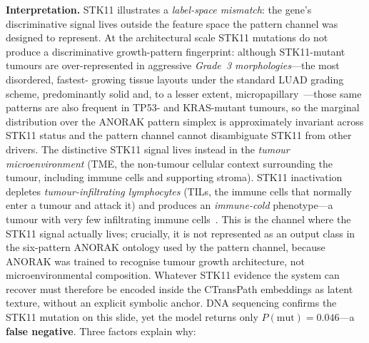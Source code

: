 \textbf{Interpretation.}
STK11 illustrates a \emph{label-space mismatch}: the gene's
discriminative signal lives outside the feature space the
pattern channel was designed to represent.
At the architectural scale STK11 mutations do not produce a
discriminative growth-pattern fingerprint: although
STK11-mutant tumours are over-represented in aggressive
\emph{Grade~3 morphologies}---the most disordered, fastest-%
growing tissue layouts under the standard LUAD grading scheme,
predominantly solid and, to a lesser extent,
micropapillary~\cite{pineda2025stk11morphology}---those same
patterns are also frequent in TP53- and KRAS-mutant tumours,
so the marginal distribution over the ANORAK pattern simplex
is approximately invariant across STK11 status and the
pattern channel cannot disambiguate STK11 from other drivers.
The distinctive STK11 signal lives instead in the
\emph{tumour microenvironment} (TME, the non-tumour cellular
context surrounding the tumour, including immune cells and
supporting stroma).
STK11 inactivation depletes
\emph{tumour-infiltrating lymphocytes} (TILs, the immune cells
that normally enter a tumour and attack
it) and produces an \emph{immune-cold} phenotype---a tumour
with very few infiltrating immune
cells~\cite{skoulidis2015krassubsets,skoulidis2018stk11pd1}.
This is the channel where the STK11 signal actually lives;
crucially, it is not represented as an output class in the
six-pattern ANORAK ontology used by the pattern channel,
because ANORAK was trained to recognise tumour growth
architecture, not microenvironmental composition.
Whatever STK11 evidence the system can recover must therefore
be encoded inside the CTransPath embeddings as latent texture,
without an explicit symbolic anchor.
DNA sequencing confirms the STK11 mutation on this slide, yet
the model returns only $P(\text{mut}) = 0.046$---a
\textbf{false negative}.
Three factors explain why:

